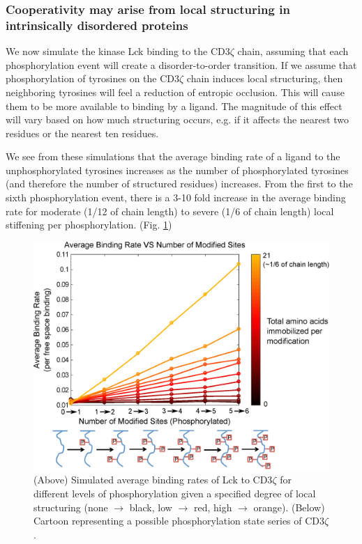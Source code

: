 \documentclass[../../AdvancementSummary.tex]{subfiles}
\begin{document}
\subsubsection{Cooperativity may arise from local structuring in intrinsically disordered proteins}

We now simulate the kinase Lck binding to the CD3$\zeta$ chain, assuming that each phosphorylation event will create a disorder-to-order transition. If we assume that phosphorylation of tyrosines on the CD3$\zeta$ chain induces local structuring, then neighboring tyrosines will feel a reduction of entropic occlusion.  This will cause them to be more available to binding by a ligand. The magnitude of this effect will vary based on how much structuring occurs, e.g. if it affects the nearest two residues or the nearest ten residues. 

We see from these simulations that the average binding rate of a ligand to the unphosphorylated tyrosines increases as the number of phosphorylated tyrosines (and therefore the number of structured residues) increases. From the first to the sixth phosphorylation event, there is a 3-10 fold increase in the average binding rate for moderate (1/12 of chain length) to severe (1/6 of chain length) local stiffening per phosphorylation. (Fig. \ref{fig: StiffeningMemOnCoop})


\begin{figure}[H]
	\begin{center}
		\includegraphics[width=0.8\linewidth]{ResultsFigures/CD3ZetaStiffeningMembraneOn/AvgBindVSTotalPhosColorMapLabeled.eps}
		\caption{(Above) Simulated average binding rates of Lck to CD3$\zeta$ for different levels of phosphorylation given a specified degree of local structuring (none $\rightarrow$ black, low $\rightarrow$ red, high $\rightarrow$ orange). (Below) Cartoon representing a possible phosphorylation state series of CD3$\zeta$. \label{fig: StiffeningMemOnCoop}}
	\end{center}
\end{figure}
\end{document}
